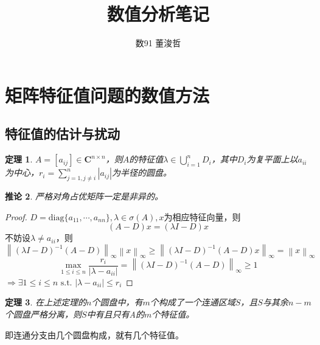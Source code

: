 \documentclass{ctexart}
\title{数值分析笔记}
\author{数91 董浚哲}
\begin{document}
\maketitle
\newcommand{\R}{\mathbf{R}}
\newcommand{\dd}{\,\mathrm{d}}
\newcommand{\st}{\text{ s.t. }}
\newcommand{\pp}[2]{\frac{\partial #1}{\partial #2}}
\newcommand{\fl}{\mathrm{fl}}
\newcommand{\nm}[1]{\left\|#1 \right\|}
\newcommand{\dif}[2]{\frac{\mathrm{d}#1}{\mathrm{d}#2}}
\newcommand{\off}{\mathrm{off}}


\newtheorem{Thm}{定理}[section]
\newtheorem{Lemma}[Thm]{引理}
\newtheorem{Prop}[Thm]{命题}
\newtheorem{Cor}[Thm]{推论}
\newtheorem{Def}{定义}[section]
\newtheorem{Rmk}{注}[section]
\newtheorem{Eg}{例}[section]
\newenvironment{solution}{\begin{proof}[Solution]}{\end{proof}}

\section{矩阵特征值问题的数值方法}
\subsection{特征值的估计与扰动}
\begin{Thm}
$A=[a_{ij}]\in \mathbf{C}^{n\times n}$，则$A$的特征值$\lambda\in\bigcup_{i=1}^nD_i$，其中$D_i$为复平面上以$a_{ii}$为中心，$r_i=\sum\limits_{j=1,j\neq i}^n|a_{ij}|$为半径的圆盘。
\end{Thm}

\begin{Cor}
严格对角占优矩阵一定是非异的。
\end{Cor}

\begin{proof}
$D=\mathrm{diag}\{a_{11},\cdots,a_{nn}\},\lambda\in\sigma(A),x$为相应特征向量，则
\[(A-D)x=(\lambda I-D)x\]
不妨设$\lambda\neq a_{ii}$，则
\[\nm{(\lambda I-D)^{-1}(A-D)}_\infty\nm{x}_\infty\geq\nm{(\lambda I-D)^{-1}(A-D)x}_{\infty}=\nm{x}_\infty\]
\[\max_{1\leq i\leq n}\frac{r_i}{|\lambda-a_{ii}|}=\nm{(\lambda I-D)^{-1}(A-D)}_\infty\geq 1\]
$\Rightarrow \exists 1\leq i\leq n\st |\lambda-a_{ii}|\leq r_{i}$
\end{proof}

\begin{Thm}
在上述定理的$n$个圆盘中，有$m$个构成了一个连通区域$S$，且$S$与其余$n-m$个圆盘严格分离，则$S$中有且只有A的$m$个特征值。
\end{Thm}
即连通分支由几个圆盘构成，就有几个特征值。
\end{document}
